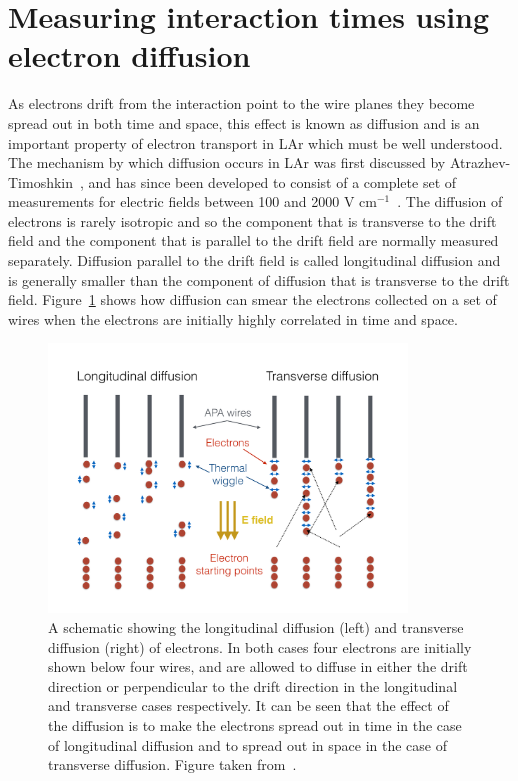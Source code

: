 \section{Measuring interaction times using electron diffusion}  \label{DiffusionAnalysis}%
As electrons drift from the interaction point to the wire planes they become spread out in both time and space, this effect is known as diffusion and is an important property of electron transport in LAr which must be well understood. The mechanism by which diffusion occurs in LAr was first discussed by Atrazhev-Timoshkin~\citep{Atrazhev-Timoshkin}, and has since been developed to consist of a complete set of measurements for electric fields between 100 and 2000 V cm$^{-1}$~\citep{Li:2015rqa}. The diffusion of electrons is rarely isotropic and so the component that is transverse to the drift field and the component that is parallel to the drift field are normally measured separately. Diffusion parallel to the drift field is called longitudinal diffusion and is generally smaller than the component of diffusion that is transverse to the drift field. Figure~\ref{fig:DomDiffSchem} shows how diffusion can smear the electrons collected on a set of wires when the electrons are initially highly correlated in time and space. \\

\begin{figure}[h!]
  \centering
  \includegraphics[width=0.85\textwidth]{DiffusionSchematic}
  \caption[Schematic showing the process of diffusion]
          {A schematic showing the longitudinal diffusion (left) and transverse diffusion (right) of electrons. In both cases four electrons are initially shown below four wires, and are allowed to diffuse in either the drift direction or perpendicular to the drift direction in the longitudinal and transverse cases respectively. It can be seen that the effect of the diffusion is to make the electrons spread out in time in the case of longitudinal diffusion and to spread out in space in the case of transverse diffusion. Figure taken from~\citep{DomSeptMeeting}.}
  \label{fig:DomDiffSchem}
\end{figure}

